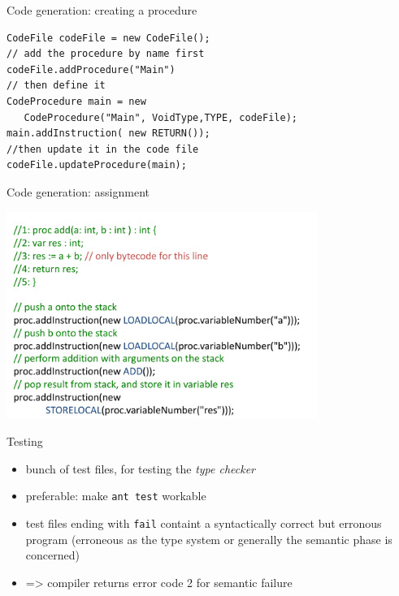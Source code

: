 \documentclass{beamer}
\begin{document}
\begin{frame}[fragile,plain,label={sec:org65f39ce}]{Code generation: creating a procedure}
 \lstset{language=java,label= ,caption= ,captionpos=b,numbers=none}
\begin{lstlisting}
CodeFile codeFile = new CodeFile();
// add the procedure by name first
codeFile.addProcedure("Main")
// then define it
CodeProcedure main = new 
   CodeProcedure("Main", VoidType,TYPE, codeFile);
main.addInstruction( new RETURN());
//then update it in the code file
codeFile.updateProcedure(main);
\end{lstlisting}
\end{frame}

\begin{frame}[label={sec:org2f2c0f2}]{Code generation: assignment}
\begin{center}
 \includegraphics[width=0.76\textwidth]{figures/snaps/codegen-assignment}
\end{center}
\end{frame}



\begin{frame}[fragile,label={sec:orgb6609d6}]{Testing}
 \begin{itemize}
\item bunch of test files, for testing the \emph{type checker}
\item preferable: make \texttt{ant test} workable

\item test files ending with \texttt{fail} containt a syntactically correct but
erronous program (erroneous as the type system or generally the semantic
phase is concerned)

\item => compiler returns error code 2 for semantic failure
\end{itemize}
\end{frame}
\end{document}
